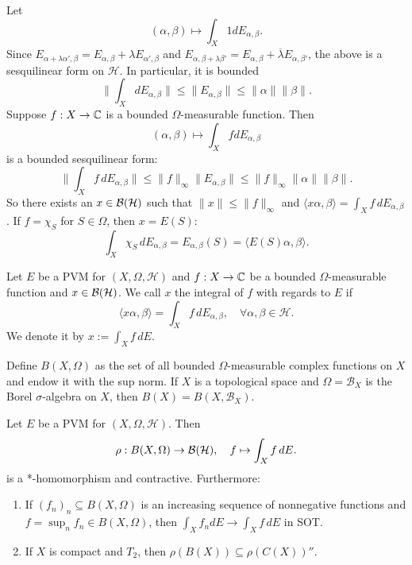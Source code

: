 Let $$(\alpha, \beta) \mapsto \int_X 1 dE_{\alpha, \beta}.$$ Since 
$E_{\alpha + \lambda \alpha', \beta} = E_{\alpha, \beta} + \lambda E_{\alpha', \beta}$ and
$E_{\alpha, \beta + \lambda \beta'} = E_{\alpha, \beta} + \overline{\lambda} E_{\alpha, \beta'}$,
the above is a sesquilinear form on $\mathcal{H}$. In particular, it is bounded
$$\| \int_X dE_{\alpha, \beta}\| \leq \| E_{\alpha, \beta}\| \leq \|\alpha\| \|\beta\|.$$
Suppose $f: X \to \mathbb {C}$ is a bounded $\Omega$-measurable function. Then 
$$(\alpha, \beta) \mapsto \int_X f dE_{\alpha, \beta}$$
is a bounded sesquilinear form:
$$\| \int_X f\, dE_{\alpha, \beta}\| \leq \|f\|_{\infty} \| E_{\alpha, \beta}\| \leq \|f\|_{\infty} \|\alpha\| \|\beta\|.$$
So there exists an $x \in \operatorname{\mathcal{B} (\mathcal{H})}$ such that $\| x\| \leq \| f\|_\infty$ and 
$\langle x \alpha, \beta \rangle = \int_X f\, dE_{\alpha, \beta}$.
If $f = \chi_S$ for $S \in \Omega$, then $x = E(S)$:
$$\int_X \chi_S\, dE_{\alpha, \beta} = E_{\alpha, \beta} (S) = \langle E(S) \alpha, \beta \rangle.$$

\begin{definition}
  Let $E$ be a PVM for $(X, \Omega, \mathcal{H})$ and $f: X \to \mathbb {C}$ be a bounded $\Omega$-measurable 
  function and $x \in \operatorname{\mathcal{B} (\mathcal{H})}$. We call $x$ the integral of $f$ with regards to $E$ if 
  $$\langle x\alpha, \beta \rangle = \int_X f\, dE_{\alpha, \beta},\quad \forall \alpha, \beta \in \mathcal{H}.$$
  We denote it by $x := \int_X f\, dE$.
\end{definition}

\begin{remark}
  Define $B(X, \Omega)$ as the set of all bounded $\Omega$-measurable complex functions on $X$ and endow it with the sup norm.
  If $X$ is a topological space and $\Omega = \mathcal{B}_X$ is the Borel $\sigma$-algebra on $X$,
  then $B(X) = B(X, \mathcal{B}_X)$.
\end{remark}

\begin{proposition}
  Let $E$ be a PVM for $(X, \Omega, \mathcal{H})$. Then 
  $$\rho: B(X, \Omega) \to \operatorname{\mathcal{B} (\mathcal{H})},\quad f \mapsto \int_X f\, dE.$$
  is a *-homomorphism and contractive. Furthermore:
  \begin{enumerate}
    \item If $(f_n)_n \subseteq B (X, \Omega)$ is an increasing sequence of nonnegative functions 
    and $f = \sup_n f_n \in B (X, \Omega)$, then $\int_X f_n dE \to \int_X f\, dE$ in SOT.
    \item If $X$ is compact and $T_2$, then $\rho (B (X)) \subseteq \rho (C(X))''$.
  \end{enumerate}
\end{proposition}

